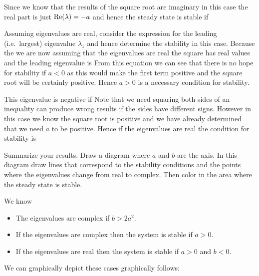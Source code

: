 \solution
Since we know that the results of the square root are imaginary in this case the real part is just ${\rm Re}(\lambda)=-a$ and hence the steady state is stable if 

\subquestion 
Assuming eigenvalues are real, consider the expression for the leading (i.e.~largest) eigenvalue $\lambda_1$ and hence determine the stability in this case. 
\solution 
Because the we are now assuming that the eigenvalues are real the square has real values and the leading eigenvalue is 
From this equation we can see that there is no hope for stability if $a<0$ as this would make the first term positive and the square root will be certainly positive. Hence $a>0$ is a necessary condition for stability.

This eigenvalue is negative if 
Note that we need squaring both sides of an inequality can produce wrong results if the sides have different signs. However in this case we know the square root is positive and we have already determined that we need $a$ to be positive. Hence if the eigenvalues are real the condition for stability is 

\subquestion 
Summarize your results. Draw a diagram where $a$ and $b$ are the axis. In this diagram draw lines that correspond to the stability conditions and the points where the eigenvalues change from real to complex. Then color in the area where the steady state is stable. 

\solution
We know 
\begin{itemize}
\item The eigenvalues are complex if $b>2a^2$.
\item If the eigenvalues are complex then the system is stable if $a>0$.
\item If the eigenvalues are real then the system is stable if $a>0$ and $b<0$.
\end{itemize}
We can graphically depict these cases graphically follows:

